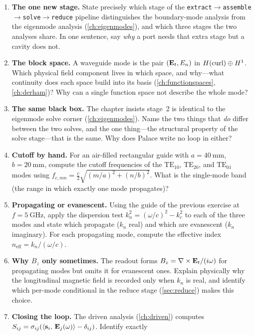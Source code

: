 \exercisessection
\begin{enumerate}[nosep]
  \item \textbf{The one new stage.} State precisely which stage of the
  \texttt{extract}$\to$\texttt{assemble}$\to$\texttt{solve}$\to$\texttt{reduce}
  pipeline distinguishes the boundary-mode analysis from the eigenmode analysis
  (\cref{ch:eigenmodes}), and which three stages the two analyses share. In one
  sentence, say \emph{why} a port needs that extra stage but a cavity does not.
  \item \textbf{The block space.} A waveguide mode is the pair $(\mathbf{E}_t, E_n)$ in
  $H(\mathrm{curl})\oplus H^1$. Which physical field component lives in which space, and
  why---what continuity does each space build into its basis
  (\cref{ch:functionspaces}, \cref{ch:derham})? Why can a single function space not
  describe the whole mode?
  \item \textbf{The same black box.} The chapter insists stage~2 is identical to
  the eigenmode solve corner (\cref{ch:eigenmodes}). Name the two things that
  \emph{do} differ between the two solves, and the one thing---the structural
  property of the solve stage---that is the same. Why does Palace write no loop in
  either?
  \item \textbf{Cutoff by hand.} For an air-filled rectangular guide with
  $a=\SI{40}{\milli\metre}$, $b=\SI{20}{\milli\metre}$, compute the cutoff
  frequencies of the $\mathrm{TE}_{10}$, $\mathrm{TE}_{20}$, and $\mathrm{TE}_{01}$
  modes using $f_{c,mn}=\tfrac{c}{2}\sqrt{(m/a)^2+(n/b)^2}$. What is the single-mode
  band (the range in which exactly one mode propagates)?
  \item \textbf{Propagating or evanescent.} Using the guide of the previous
  exercise at $f=\SI{5}{\giga\hertz}$, apply the dispersion test
  $k_n^2=(\omega/c)^2-k_c^2$ to each of the three modes and state which propagate
  ($k_n$ real) and which are evanescent ($k_n$ imaginary). For each propagating
  mode, compute the effective index $n_\text{eff}=k_n/(\omega/c)$.
  \item \textbf{Why $B_z$ only sometimes.} The readout forms
  $B_z=\nabla\times\mathbf{E}_t/(i\omega)$ for propagating modes but omits it for evanescent
  ones. Explain physically why the longitudinal magnetic field is recorded only
  when $k_n$ is real, and identify which per-mode conditional in the reduce stage
  (\cref{sec:reduce}) makes this choice.
  \item \textbf{Closing the loop.} The driven analysis (\cref{ch:driven}) computes
  $S_{ij}=\sigma_{ij}(\left\langle \mathbf{s}_i,\, \mathbf{E}_j(\omega)\right\rangle-\delta_{ij})$. Identify exactly

\end{enumerate}
